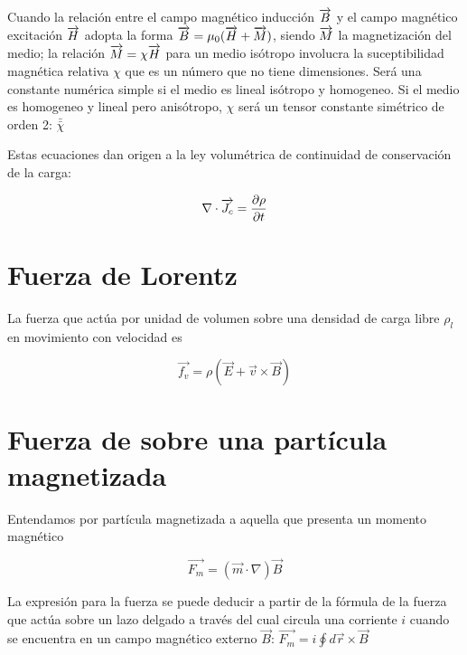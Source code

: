 \label{relMH}
Cuando la relación entre el campo magnético inducción $\overrightarrow{B}$ y el campo magnético excitación $\overrightarrow{H}$ adopta la forma $\overrightarrow{B}=\mu_{0}(\overrightarrow{H}+\overrightarrow{M})$, siendo $\overrightarrow{M}$ la magnetización del medio; la relación $\overrightarrow{M}=\chi\overrightarrow{H}$ para un medio isótropo involucra la suceptibilidad magnética relativa $\chi$ que es un número que no tiene dimensiones. Será una constante numérica simple  si el medio es lineal isótropo y homogeneo. Si el medio es homogeneo y lineal pero anisótropo, $\chi$ será un tensor constante simétrico de orden 2: $\bar{\bar{\chi}}$ 



Estas ecuaciones dan origen a la ley volumétrica de continuidad de conservación de la carga:

\begin{equation}
	\nabla \cdot \overrightarrow{J_{c}} = \dfrac{\partial \rho}{\partial t} 
\end{equation}

\section{Fuerza de Lorentz}

La fuerza que actúa por unidad de volumen sobre una densidad de carga libre $\rho_{l}$ en movimiento con velocidad  es

\begin{equation}
	\label{eq:FLorentz}
	\overrightarrow{f_{v}}= \rho(\overrightarrow{E}+\overrightarrow{v}\times\overrightarrow{B})
\end{equation}

\section{Fuerza de sobre una partícula magnetizada}

Entendamos por partícula magnetizada a aquella que presenta un momento magnético 

\begin{equation}
	\label{eq:FPartMag}
	\overrightarrow{F_{m}}= \left( \overrightarrow{m} \cdot \nabla \right) \overrightarrow{B}
\end{equation}

La expresión para la fuerza se puede deducir a partir de la fórmula de la fuerza que actúa sobre un lazo delgado a través del cual circula una corriente $i$ cuando se encuentra en un campo magnético externo $\overrightarrow{B}$: $\overrightarrow{F_{m}}=i\oint d\overrightarrow{r}\times\overrightarrow{B}$ 


